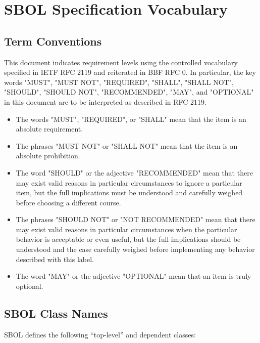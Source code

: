 \section{SBOL Specification Vocabulary}

\subsection{Term Conventions}

This document indicates requirement levels using the controlled vocabulary specified in IETF RFC 2119 and reiterated in BBF RFC 0.
In particular, the key words "MUST", "MUST NOT", "REQUIRED", "SHALL", "SHALL NOT", "SHOULD", "SHOULD NOT", "RECOMMENDED", "MAY", and "OPTIONAL" in this document are to be interpreted as described in RFC 2119.

\begin{itemize}
\item The words "MUST", "REQUIRED", or "SHALL" mean that the item is an absolute requirement.
\item The phrases "MUST NOT" or "SHALL NOT" mean that the item is an absolute prohibition.
\item The word "SHOULD" or the adjective "RECOMMENDED" mean that there may exist valid reasons in particular circumstances to ignore a particular item, but the full implications must be understood and carefully weighed before choosing a different course.
\item The phrases "SHOULD NOT" or "NOT RECOMMENDED" mean that there may exist valid reasons in particular circumstances when the particular behavior is acceptable or even useful, but the full implications should be understood and the case carefully weighed before implementing any behavior described with this label.
\item The word "MAY" or the adjective "OPTIONAL" mean that an item is truly optional.
\end{itemize}

\subsection{SBOL Class Names}

SBOL defines the following ``top-level'' and dependent classes:

